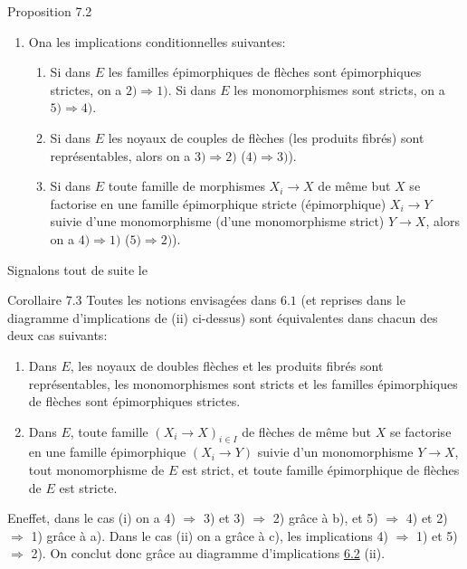 \begin{enonce*}{Proposition 7.2}
\begin{enumerate}
\item On\pageoriginale a les implications conditionnelles suivantes:
\begin{enumerate}
\renewcommand{\theenumii}{\alph{enumii}}
\renewcommand{\labelenumii}{\theenumii)}
\item Si dans $E$ les familles épimorphiques de flèches sont
  épimorphiques strictes, on a $2)\Rightarrow 1)$. Si dans $E$ les
  monomorphismes sont stricts, on a $5)\Rightarrow 4)$.

\item Si dans $E$ les noyaux de couples de flèches (\resp  les
  produits fibrés) sont représentables, alors on a $3)\Rightarrow
  2)$ (\resp  $4)\Rightarrow 3)$).

\item Si dans $E$ toute famille de morphismes $X_i\rightarrow X$ de
  même but $X$ se factorise en une famille épimorphique stricte
  (\resp  épimorphique) $X_i\rightarrow Y$ suivie d'une monomorphisme
  (\resp  d'une monomorphisme strict) $Y\rightarrow X$, alors on a
  $4)\Rightarrow 1)$ (\resp  $5)\Rightarrow 2)$).
\end{enumerate}
\end{enumerate}
\end{enonce*}
Signalons tout de suite le

\begin{enonce*}{Corollaire 7.3}
Toutes les notions envisagées dans $6.1$ (et reprises dans le
diagramme d'implications de {\rm(ii)} ci-dessus) sont équivalentes
dans chacun des deux cas suivants:
\begin{enumerate}
\renewcommand{\theenumi}{\roman{enumi}}
\renewcommand{\labelenumi}{(\theenumi)}
\item Dans $E$, les noyaux de doubles flèches et les produits
  fibrés sont représentables, les monomorphismes sont stricts et
  les familles épimorphiques de flèches sont épimorphiques
  strictes.

\item Dans $E$, toute famille $(X_i\rightarrow X)_{i\in I}$ de
  flèches de même but $X$ se factorise en une famille
  épimorphique $(X_i\rightarrow Y)$ suivie d'un monomorphisme
  $Y\rightarrow X$, tout monomorphisme de $E$ est strict, et toute
  famille épimorphique de flèches de $E$ est stricte.
\end{enumerate}
\end{enonce*}

En\pageoriginale effet, dans le cas (i) on a 4) $\Rightarrow$ 3) et
3) $\Rightarrow$ 2) grâce à b), et 5) $\Rightarrow$ 4) et 2)
$\Rightarrow$ 1) grâce à a). Dans le cas (ii) on a grâce à c), les
implications 4) $\Rightarrow$ 1) et 5) $\Rightarrow$ 2). On conclut
donc grâce au diagramme d'implications \hyperref[I.prop6.2]{6.2} (ii).

